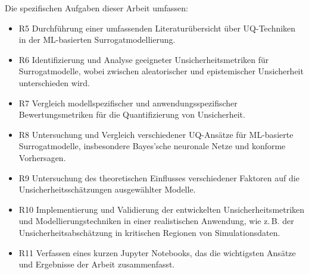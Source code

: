 Die spezifischen Aufgaben dieser Arbeit umfassen:

\begin{itemize}
  \item {R5} Durchführung einer umfassenden Literaturübersicht über UQ-Techniken in der ML-basierten Surrogatmodellierung.
  \item {R6} Identifizierung und Analyse geeigneter Unsicherheitsmetriken für Surrogatmodelle, wobei zwischen aleatorischer und epistemischer Unsicherheit unterschieden wird.
  \item {R7} Vergleich modellspezifischer und anwendungsspezifischer Bewertungsmetriken für die Quantifizierung von Unsicherheit.
  \item {R8} Untersuchung und Vergleich verschiedener UQ-Ansätze für ML-basierte Surrogatmodelle, insbesondere Bayes'sche neuronale Netze und konforme Vorhersagen.
  \item {R9} Untersuchung des theoretischen Einflusses verschiedener Faktoren auf die Unsicherheitsschätzungen ausgewählter Modelle.
  \item {R10} Implementierung und Validierung der entwickelten Unsicherheitsmetriken und Modellierungstechniken in einer realistischen Anwendung, wie z.\,B. der Unsicherheitsabschätzung in kritischen Regionen von Simulationsdaten.
  \item {R11} Verfassen eines kurzen Jupyter Notebooks, das die wichtigsten Ansätze und Ergebnisse der Arbeit zusammenfasst.
\end{itemize}






